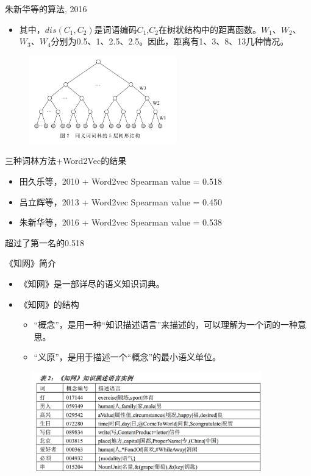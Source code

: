 \documentclass{beamer}
\begin{document}
    \begin{frame}{朱新华等的算法, 2016}
      \begin{itemize}
        \item 其中，$dis(C_1, C_2)$是词语编码$C_1$,$C_2$在树状结构中的距离函数。$W_1$、$W_2$、$W_3$、$W_4$分别为0.5、1、2.5、2.5。因此，距离有1、3、8、13几种情况。
      \end{itemize}
      \begin{figure}
      \includegraphics[width=2.52in,height=1.5in]{cilin2016.png}
      \end{figure}
    \end{frame}

    \begin{frame}{三种词林方法+Word2Vec的结果}
      \begin{itemize}
        \item 田久乐等，2010 + Word2vec 
        Spearman value = 0.518
        \item 吕立辉等，2013 + Word2vec 
        Spearman value = 0.450
        \item 朱新华等，2016 + Word2vec 
        Spearman value = 0.538
      \end{itemize}
      超过了第一名的0.518
    \end{frame}

    \begin{frame}{《知网》简介}
      \begin{itemize}
        \item 《知网》是一部详尽的语义知识词典。
        \item 《知网》的结构
          \begin{itemize}
            \item “概念”，是用一种“知识描述语言”来描述的，可以理解为一个词的一种意思。
            \item “义原”，是用于描述一个“概念”的最小语义单位。
          \end{itemize}
      \end{itemize}
      \begin{figure}
      \includegraphics[width=4in,height=1.7in]{hownet1.png}
      \end{figure}
    \end{frame}
\end{document}
